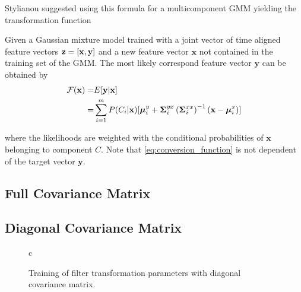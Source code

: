 Stylianou \etal \cite{stylianou95} suggested using this formula for a multicomponent GMM yielding the transformation function
\begin{definition}
	Given a Gaussian mixture model trained with a joint vector of time aligned feature vectors $\mathbf{z} = \left[\mathbf{x},\mathbf{y}\right]$ and a new feature vector $\mathbf{x}$ not contained in the training set of the GMM. The most likely correspond feature vector $\mathbf{y}$ can be obtained by
	\begin{equation}
		\label{eq:conversion_function}
		\begin{split}
			\mathcal F(\mathbf{x}) =& E[\mathbf{y}\vert \mathbf{x}]\\
			=& \sum_{i=1}^{m}P(C_i \vert \mathbf{x})[\boldsymbol{\mu}_i^y + \mathbf{\Sigma}_i^{yx} \left(\mathbf{\Sigma}_i^{xx}\right)^{-1} (\mathbf{x}-\boldsymbol{\mu}_i^x)]
		\end{split}
	\end{equation}
\end{definition}

where the likelihoods are weighted with the conditional probabilities of $\mathbf{x}$ belonging to component $C$. Note that \eqref{eq:conversion_function} is not dependent of the target vector $\mathbf{y}$.


\subsection{Full Covariance Matrix} %
\label{sub:full_covariance_matrix}


\subsection{Diagonal Covariance Matrix} %
\label{sub:diagonal_covariance_matrix}
\begin{figure}[htbp]
	\centering
	\begin{tabular}[h]{c}
	\end{tabular}
	\caption{Training of filter transformation parameters with diagonal covariance matrix.}
	\label{fig:VC_training_diag}
\end{figure}

